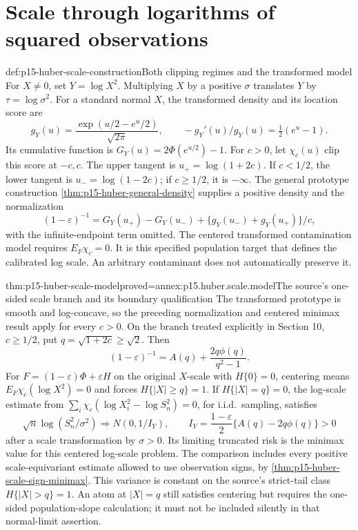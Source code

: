 \section{Scale through logarithms of squared observations}
\label{sec:p15-huber-log-scale}

\begin{hbdefinition}{def:p15-huber-scale-construction}{Both clipping regimes and the transformed model}
For \(X\ne0\), set \(Y=\log X^2\). Multiplying \(X\) by a positive
\(\sigma\) translates \(Y\) by \(\tau=\log\sigma^2\).
For a standard normal \(X\), the transformed density and its
location score are
\[
 g_Y(u)=\frac{\exp(u/2-e^u/2)}{\sqrt{2\pi}},\qquad
 -g_Y'(u)/g_Y(u)=\tfrac12(e^u-1).
\]
Its cumulative function is \(G_Y(u)=2\Phi(e^{u/2})-1\).
For \(c>0\), let \(\chi_c(u)\) clip this score at \(-c,c\).
The upper tangent is \(u_+=\log(1+2c)\).
If \(c<1/2\), the lower tangent is \(u_-=\log(1-2c)\);
if \(c\geq1/2\), it is \(-\infty\).
The general prototype construction
\cref{thm:p15-huber-general-density} supplies a positive density
and the normalization
\[
 (1-\varepsilon)^{-1}
 =G_Y(u_+)-G_Y(u_-)
       +\{g_Y(u_-)+g_Y(u_+)\}/c,
\]
with the infinite-endpoint term omitted.
The centered transformed contamination model requires \(E_F\chi_c=0\).
It is this specified population target that defines the calibrated
log scale. An arbitrary contaminant does not automatically preserve it.
\end{hbdefinition}

\begin{hbtheorem}{thm:p15-huber-scale-model}{proved=annex:p15.huber.scale.model}{The source's one-sided scale branch and its boundary qualification}
The transformed prototype is smooth and log-concave, so the
preceding normalization and centered minimax result apply for
every \(c>0\). On the branch treated explicitly in Section 10,
\(c\geq1/2\), put \(q=\sqrt{1+2c}\geq\sqrt2\). Then
\[
 (1-\varepsilon)^{-1}
       =A(q)+\frac{2q\phi(q)}{q^2-1}.
\]
For \(F=(1-\varepsilon)\Phi+\varepsilon H\) on the original
\(X\)-scale with \(H\{0\}=0\), centering means
\(E_F\chi_c(\log X^2)=0\) and forces \(H\{|X|\geq q\}=1\).
If \(H\{|X|=q\}=0\), the log-scale estimate from
\(\sum_i\chi_c(\log X_i^2-\log S_n^2)=0\), for i.i.d.\ sampling,
satisfies
\[
 \sqrt n\log(S_n^2/\sigma^2)\Longrightarrow N(0,1/I_Y),\qquad
 I_Y=\frac{1-\varepsilon}{2}\{A(q)-2q\phi(q)\}>0
\]
after a scale transformation by \(\sigma>0\).
Its limiting truncated risk is the minimax value for this centered
log-scale problem. The comparison includes every positive
scale-equivariant estimate allowed to use observation signs,
by \cref{thm:p15-huber-scale-sign-minimax}.
This variance is constant on the source's
strict-tail class \(H\{|X|>q\}=1\).
An atom at \(|X|=q\) still satisfies centering but requires the
one-sided population-slope calculation; it must not be included
silently in that normal-limit assertion.
\end{hbtheorem}

